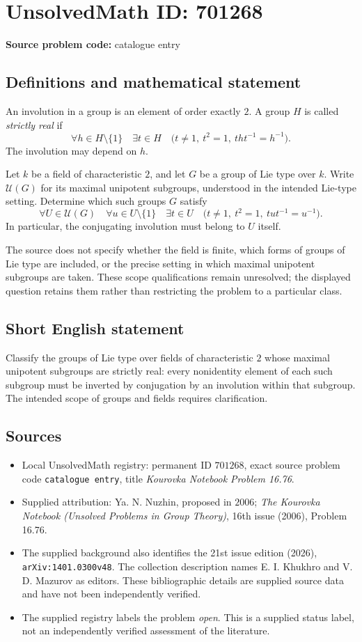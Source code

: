 \documentclass[11pt]{article}
\begin{document}
\section*{UnsolvedMath ID: 701268}
\textbf{Source problem code:} catalogue entry
\subsection{Definitions and mathematical statement}
An involution in a group is an element of order exactly \(2\). A group \(H\) is called \emph{strictly real} if
\[
\forall h\in H\setminus\{1\}\quad \exists t\in H\quad
\bigl(t\ne 1,\ t^2=1,\ tht^{-1}=h^{-1}\bigr).
\]
The involution may depend on \(h\).

Let \(k\) be a field of characteristic \(2\), and let \(G\) be a group of Lie type over \(k\). Write \(\mathcal U(G)\) for its maximal unipotent subgroups, understood in the intended Lie-type setting. Determine which such groups \(G\) satisfy
\[
\forall U\in\mathcal U(G)\quad
\forall u\in U\setminus\{1\}\quad
\exists t\in U\quad
\bigl(t\ne 1,\ t^2=1,\ tut^{-1}=u^{-1}\bigr).
\]
In particular, the conjugating involution must belong to \(U\) itself.

The source does not specify whether the field is finite, which forms of groups of Lie type are included, or the precise setting in which maximal unipotent subgroups are taken. These scope qualifications remain unresolved; the displayed question retains them rather than restricting the problem to a particular class.
\subsection{Short English statement}
Classify the groups of Lie type over fields of characteristic \(2\) whose maximal unipotent subgroups are strictly real: every nonidentity element of each such subgroup must be inverted by conjugation by an involution within that subgroup. The intended scope of groups and fields requires clarification.
\subsection{Sources}
\begin{itemize}
\item Local UnsolvedMath registry: permanent ID \(701268\), exact source problem code \texttt{catalogue entry}, title \emph{Kourovka Notebook Problem 16.76}.
\item Supplied attribution: Ya. N. Nuzhin, proposed in \(2006\); \emph{The Kourovka Notebook (Unsolved Problems in Group Theory)}, 16th issue (2006), Problem 16.76.
\item The supplied background also identifies the 21st issue edition (2026), \texttt{arXiv:1401.0300v48}. The collection description names E. I. Khukhro and V. D. Mazurov as editors. These bibliographic details are supplied source data and have not been independently verified.
\item The supplied registry labels the problem \emph{open}. This is a supplied status label, not an independently verified assessment of the literature.
\end{itemize}
\end{document}

